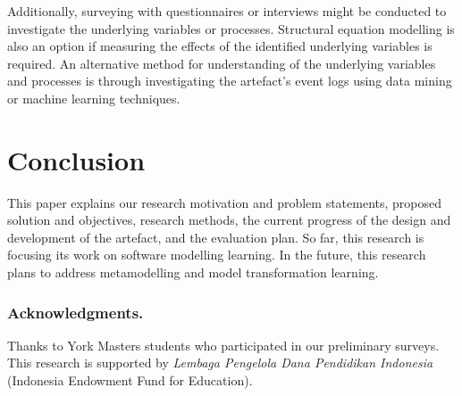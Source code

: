 \documentclass[runningheads,a4paper]{llncs}
\begin{document}
Additionally, surveying with questionnaires or interviews might be conducted to investigate the underlying variables or processes. Structural equation modelling \cite{hair2016primer} is also an option if measuring the effects of the identified underlying variables is required. An alternative method for understanding of the underlying variables and processes is through investigating the artefact's event logs using data mining or machine learning techniques.

\section{Conclusion}
This paper explains our research motivation and problem statements, proposed solution and objectives, research methods, the current progress of the design and development of the artefact, and the evaluation plan. So far, this research is focusing its work on software modelling learning. In the future, this research plans to address metamodelling and model transformation learning. 


\subsubsection*{Acknowledgments.} Thanks to York Masters students who participated in our preliminary surveys. This research is supported by \emph{Lembaga Pengelola Dana Pendidikan Indonesia} (Indonesia Endowment Fund for Education). 

 

\end{document}
